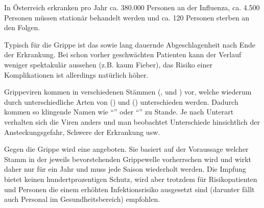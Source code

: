In Österreich erkranken pro Jahr ca. 380.000 Personen an der
Influenza, ca. 4.500 Personen müssen stationär behandelt werden und
ca. 120 Personen sterben an den
Folgen\cite{Strauss0000}.



{
Typisch für die Grippe ist das  sowie lang dauernde Abgeschlagenheit nach
Ende der Erkrankung. Bei schon vorher geschwächten
Patienten kann der Verlauf weniger spektakulär aussehen (z.B. kaum Fieber), das Risiko einer Komplikationen ist allerdings natürlich höher. 
}
{
}
{}
{}
{}


{
Grippeviren kommen in verschiedenen
Stämmen (,  und ) vor, welche
wiederum durch unterschiedliche Arten von
 () und 
() unterschieden werden. Dadurch kommen so
klingende Namen wie "`"' oder
"`"' zu Stande. Je nach Unterart verhalten sich die Viren anders und man beobachtet Unterschiede hinsichtlich der
Ansteckungsgefahr, Schwere der Erkrankung usw. 
\Z{}
}
{

}
{}
{}
{}

{
Gegen die Grippe wird eine
 angeboten. Sie basiert auf der Voraussage
welcher Stamm in der jeweils bevorstehenden Grippewelle
vorherrschen wird und wirkt daher nur für ein Jahr und muss
jede Saison wiederholt werden. Die Impfung bietet keinen
hundertprozentigen Schutz, wird aber trotzdem für
Risikopatienten und Personen die einem erhöhten
Infektionsrisiko ausgesetzt sind (darunter fällt auch
Personal im Gesundheitsbereich) empfohlen.
}
{
}
{}
{}
{}

\cite{Gallaher2009,H1N1InvTeam2009,Peiris2009,Wolf2009,Cutler2009}



